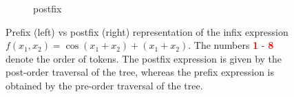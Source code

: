 \documentclass[runningheads]{llncs}
\begin{document}
\begin{figure}[ht]
\begin{subfigure}[b]{0.51\textwidth}
        \centering
        \caption{postfix} \label{subfig:postfix_tree_example}
    \end{subfigure}
    \caption{Prefix (left) vs postfix (right) representation of the infix expression $f(x_1, x_2) = \cos(x_1 + x_2) + (x_1 + x_2)$. The numbers \textcolor{red}{\textbf{1}} - \textcolor{red}{\textbf{8}} denote the order of tokens. The postfix expression is given by the post-order traversal of the tree, whereas the prefix expression is obtained by the pre-order traversal of the tree.}
    \label{fig:prefix_vs_postfix}
\end{figure}
\end{document}
